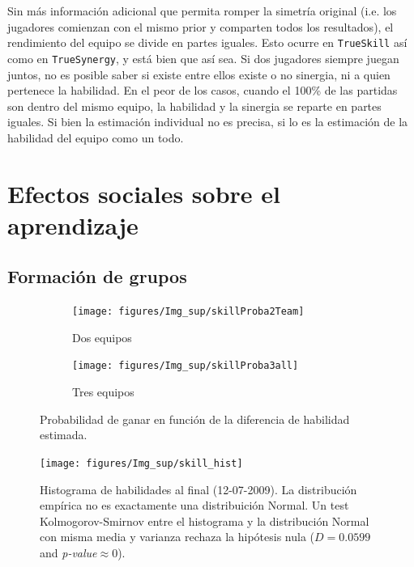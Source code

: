\documentclass[a4paper,11pt]{book}
\theoremstyle{definition}
\begin{document}
Sin m\'as informaci\'on adicional que permita romper la simetr\'ia original (i.e. los jugadores comienzan con el mismo prior y comparten todos los resultados), el rendimiento del equipo se divide en partes iguales.
Esto ocurre en \texttt{TrueSkill} as\'i como en \texttt{TrueSynergy}, y est\'a bien que as\'i sea.
Si dos jugadores siempre juegan juntos, no es posible saber si existe entre ellos existe o no sinergia, ni a quien pertenece la habilidad.
En el peor de los casos, cuando el 100\% de las partidas son dentro del mismo equipo, la habilidad y la sinergia se reparte en partes iguales.
Si bien la estimaci\'on individual no es precisa, si lo es la estimaci\'on de la habilidad del equipo como un todo.



\section{Efectos sociales sobre el aprendizaje}

\subsection{Formaci\'on de grupos}

\begin{figure}[H]
  \centering
  \begin{subfigure}[b]{0.49\textwidth}
    \texttt{[image: figures/Img\_sup/skillProba2Team]}
    \caption{Dos equipos}
    \label{skillProba2_ind_team}
  \end{subfigure}
  \begin{subfigure}[b]{0.49\textwidth}
    \texttt{[image: figures/Img\_sup/skillProba3all]}
    \caption{Tres equipos}
    \label{skillProba3all}
  \end{subfigure}
  \caption{Probabilidad de ganar en funci\'on de la diferencia de habilidad estimada.}
  \label{skill_proba}
\end{figure}



\begin{figure}[H]
    \centering
    \texttt{[image: figures/Img\_sup/skill\_hist]}
    \caption{
    Histograma de habilidades al final (12-07-2009).
    La distribuci\'on emp\'irica no es exactamente una distribuici\'on Normal. Un test Kolmogorov-Smirnov entre el histograma y la distribuci\'on Normal con misma media y varianza rechaza la hip\'otesis nula ($D = 0.0599$ and \emph{p-value}$\approx 0$).}
    \label{skill_hist}
\end{figure}
\end{document}
